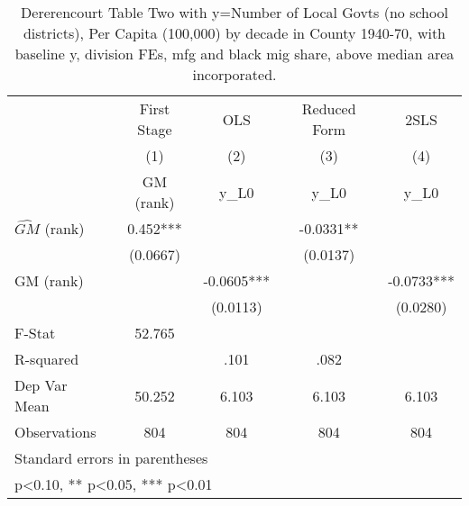 \begin{table}[htbp]\centering
\def\sym#1{\ifmmode^{#1}\else\(^{#1}\)\fi}
\caption{Dererencourt Table Two with y=Number of Local Govts (no school districts), Per Capita (100,000) by decade in County 1940-70, with baseline y, division FEs, mfg and black mig share, above median area incorporated.}
\begin{tabular}{l*{4}{c}}
\toprule
                    & First Stage   &         OLS   &Reduced Form   &        2SLS   \\
                    &\multicolumn{1}{c}{(1)}&\multicolumn{1}{c}{(2)}&\multicolumn{1}{c}{(3)}&\multicolumn{1}{c}{(4)}\\
                    &\multicolumn{1}{c}{GM  (rank)}&\multicolumn{1}{c}{y\_L0}&\multicolumn{1}{c}{y\_L0}&\multicolumn{1}{c}{y\_L0}\\
\midrule
$\hat{GM}$ (rank)   &       0.452***&               &     -0.0331** &               \\
                    &    (0.0667)   &               &    (0.0137)   &               \\
\addlinespace
GM  (rank)          &               &     -0.0605***&               &     -0.0733***\\
                    &               &    (0.0113)   &               &    (0.0280)   \\
\midrule
F-Stat              &      52.765   &               &               &               \\
R-squared           &               &        .101   &        .082   &               \\
Dep Var Mean        &      50.252   &       6.103   &       6.103   &       6.103   \\
Observations        &         804   &         804   &         804   &         804   \\
\bottomrule
\multicolumn{5}{l}{\footnotesize Standard errors in parentheses}\\
\multicolumn{5}{l}{\footnotesize * p<0.10, ** p<0.05, *** p<0.01}\\
\end{tabular}
\end{table}
